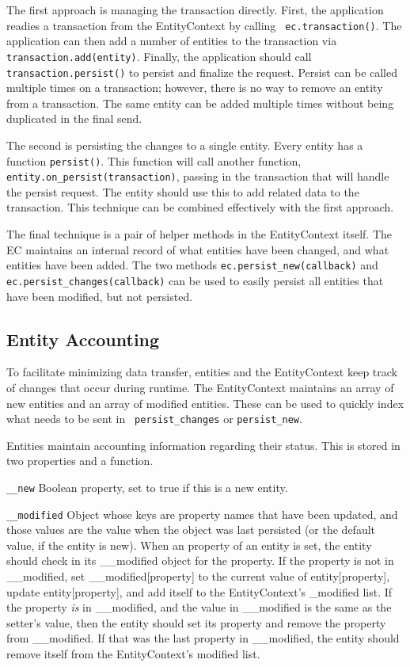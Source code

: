 \documentclass{article}
\newcommand{\ilcode}{\tt}
\begin{document}
The first approach is managing the transaction directly. First, the application
readies a transaction from the EntityContext by calling {\ilcode
ec.transaction()}. The application can then add a number of entities to the
transaction via {\ilcode transaction.add(entity)}. Finally, the application
should call {\ilcode transaction.persist()} to persist and finalize the request.
Persist can be called multiple times on a transaction; however, there is no way
to remove an entity from a transaction. The same entity can be added multiple
times without being duplicated in the final send.

The second is persisting the changes to a single entity. Every entity has a
function {\ilcode persist()}. This function will call another function,
{\ilcode entity.on\_persist(transaction)}, passing in the transaction that will
handle the persist request. The entity should use this to add related data to
the transaction. This technique can be combined effectively with the first
approach.

The final technique is a pair of helper methods in the EntityContext itself. The
EC maintains an internal record of what entities have been changed, and what
entities have been added. The two methods {\ilcode ec.persist\_new(callback)}
and {\ilcode ec.persist\_changes(callback)} can be used to easily persist all
entities that have been modified, but not persisted.

\subsection{Entity Accounting} To facilitate minimizing data transfer, entities
and the EntityContext keep track of changes that occur during runtime. The
EntityContext maintains an array of new entities and an array of modified
entities. These can be used to quickly index what needs to be sent in {\ilcode
persist\_changes} or {\ilcode persist\_new}.

Entities maintain accounting information regarding their status. This is stored
in two properties and a function.

{\ilcode \_\_new} Boolean property, set to true if this is a new entity.

{\ilcode \_\_modified} Object whose keys are property names that have been
updated, and those values are the value when the object was last persisted (or
the default value, if the entity is new). When an property of an entity is set,
the entity should check in its \_\_modified object for the property. If the
property is not in \_\_modified, set \_\_modified[property] to the current value
of entity[property], update entity[property], and add itself to the
EntityContext's \_modified list. If the property {\it  is} in \_\_modified, and
the value in \_\_modified is the same as the setter's value, then the entity
should set its property and remove the property from \_\_modified. If that was
the last property in \_\_modified, the entity should remove itself from the
EntityContext's modified list.
\end{document}
